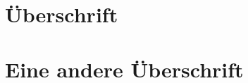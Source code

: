 \thispagestyle{empty}
\blindtext
\clearpage
\section{Überschrift}
\blindtext
\clearpage
\thispagestyle{plain}
\blindtext
\clearpage
\section{Eine andere Überschrift}
\blindtext
\clearpage
\blindtext
\clearpage